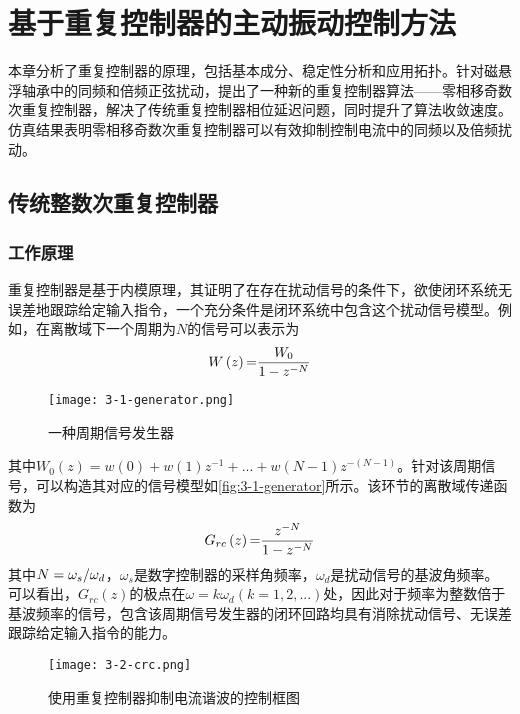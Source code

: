 \chapter{基于重复控制器的主动振动控制方法}
本章分析了重复控制器的原理，包括基本成分、稳定性分析和应用拓扑。针对磁悬浮轴承中的同频和倍频正弦扰动，提出了一种新的重复控制器算法——零相移奇数次重复控制器，解决了传统重复控制器相位延迟问题，同时提升了算法收敛速度。仿真结果表明零相移奇数次重复控制器可以有效抑制控制电流中的同频以及倍频扰动。
\section{传统整数次重复控制器}
\subsection{工作原理}
重复控制器是基于内模原理\cite{francis1975internal}，其证明了在存在扰动信号的条件下，欲使闭环系统无误差地跟踪给定输入指令，一个充分条件是闭环系统中包含这个扰动信号模型。例如，在离散域下一个周期为$N$的信号可以表示为
\begin{equation}
\label{eq3-1}
W\left( z \right){\rm{ = }}{{{W_0}} \over {1 - {z^{ - N}}}}
\end{equation}

\begin{figure}
	\texttt{[image: 3-1-generator.png]}
	\caption{一种周期信号发生器}
	\label{fig:3-1-generator}
\end{figure}

其中${W_0}\left( z \right) = w\left( 0 \right) + w\left( 1 \right){z^{ - 1}} + ... + w\left( {N - 1} \right){z^{ - \left( {N - 1} \right)}}$。针对该周期信号，可以构造其对应的信号模型如\autoref{fig:3-1-generator}所示。该环节的离散域传递函数为
\begin{equation}
\label{eq3-2}
{G_{rc}}\left( z \right){\rm{ = }}{{{z^{ - N}}} \over {1 - {z^{ - N}}}}
\end{equation}
其中$N = {{{\omega _s}} \mathord{\left/
 {\vphantom {{{\omega _s}} {{\omega _d}}}} \right.
 \kern-\nulldelimiterspace} {{\omega _d}}}$，$\omega _s$是数字控制器的采样角频率，$\omega _d$是扰动信号的基波角频率。可以看出，$G_{rc}(z)$的极点在$\omega = k\omega_d(k = 1,2,...)$处，因此对于频率为整数倍于基波频率的信号，包含该周期信号发生器的闭环回路均具有消除扰动信号、无误差跟踪给定输入指令的能力。
 
\begin{figure}
	\texttt{[image: 3-2-crc.png]}
	\caption{使用重复控制器抑制电流谐波的控制框图}
	\label{fig:3-2-crc}
\end{figure}

